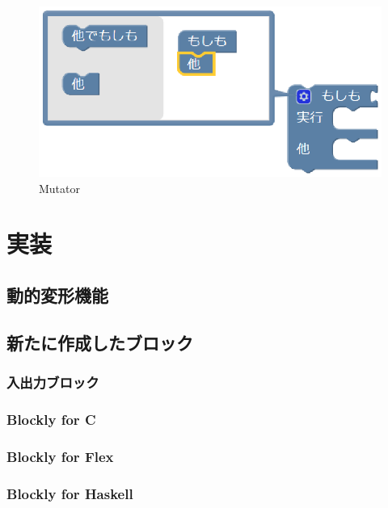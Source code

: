 \documentclass{eniepaper}
\begin{document}
\begin{figure}[h]
\begin{center}
\includegraphics[scale=0.5]{img/mutator2.eps}
\caption{Mutator}%
\label{fig:mutator2}
\end{center}%
\end{figure}%

   \chapter{実装}
   
   \section{動的変形機能}   
   
   \section{新たに作成したブロック}

   \subsection{入出力ブロック}
   
   \subsection{Blockly for C}
   
   \subsection{Blockly for Flex}
  
   \subsection{Blockly for Haskell}
\end{document}

